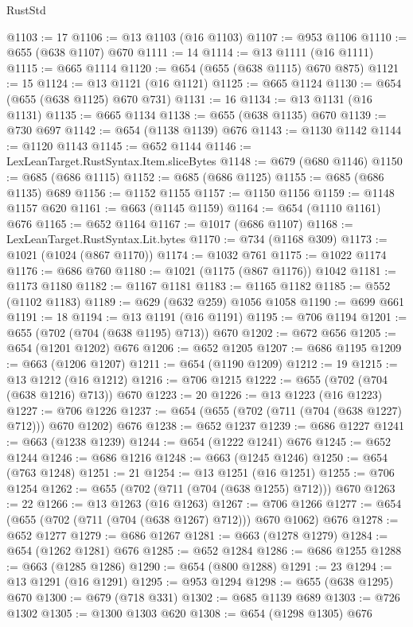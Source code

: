 \begin{lexlean}{RustStd}
\begin{coremodule}
@1103 := 17
@1106 := @13 @1103 (@16 @1103)
@1107 := @953 @1106
@1110 := @655 (@638 @1107) @670
@1111 := 14
@1114 := @13 @1111 (@16 @1111)
@1115 := @665 @1114
@1120 := @654 (@655 (@638 @1115) @670 @875)
@1121 := 15
@1124 := @13 @1121 (@16 @1121)
@1125 := @665 @1124
@1130 := @654 (@655 (@638 @1125) @670 @731)
@1131 := 16
@1134 := @13 @1131 (@16 @1131)
@1135 := @665 @1134
@1138 := @655 (@638 @1135) @670
@1139 := @730 @697
@1142 := @654 (@1138 @1139) @676
@1143 := @1130 @1142
@1144 := @1120 @1143
@1145 := @652 @1144
@1146 := LexLeanTarget.RustSyntax.Item.sliceBytes
@1148 := @679 (@680 @1146)
@1150 := @685 (@686 @1115)
@1152 := @685 (@686 @1125)
@1155 := @685 (@686 @1135) @689
@1156 := @1152 @1155
@1157 := @1150 @1156
@1159 := @1148 @1157 @620
@1161 := @663 (@1145 @1159)
@1164 := @654 (@1110 @1161) @676
@1165 := @652 @1164
@1167 := @1017 (@686 @1107)
@1168 := LexLeanTarget.RustSyntax.Lit.bytes
@1170 := @734 (@1168 @309)
@1173 := @1021 (@1024 (@867 @1170))
@1174 := @1032 @761
@1175 := @1022 @1174
@1176 := @686 @760
@1180 := @1021 (@1175 (@867 @1176)) @1042
@1181 := @1173 @1180
@1182 := @1167 @1181
@1183 := @1165 @1182
@1185 := @552 (@1102 @1183)
@1189 := @629 (@632 @259) @1056 @1058
@1190 := @699 @661
@1191 := 18
@1194 := @13 @1191 (@16 @1191)
@1195 := @706 @1194
@1201 := @655 (@702 (@704 (@638 @1195) @713)) @670
@1202 := @672 @656
@1205 := @654 (@1201 @1202) @676
@1206 := @652 @1205
@1207 := @686 @1195
@1209 := @663 (@1206 @1207)
@1211 := @654 (@1190 @1209)
@1212 := 19
@1215 := @13 @1212 (@16 @1212)
@1216 := @706 @1215
@1222 := @655 (@702 (@704 (@638 @1216) @713)) @670
@1223 := 20
@1226 := @13 @1223 (@16 @1223)
@1227 := @706 @1226
@1237 := @654 (@655 (@702 (@711 (@704 (@638 @1227) @712))) @670 @1202) @676
@1238 := @652 @1237
@1239 := @686 @1227
@1241 := @663 (@1238 @1239)
@1244 := @654 (@1222 @1241) @676
@1245 := @652 @1244
@1246 := @686 @1216
@1248 := @663 (@1245 @1246)
@1250 := @654 (@763 @1248)
@1251 := 21
@1254 := @13 @1251 (@16 @1251)
@1255 := @706 @1254
@1262 := @655 (@702 (@711 (@704 (@638 @1255) @712))) @670
@1263 := 22
@1266 := @13 @1263 (@16 @1263)
@1267 := @706 @1266
@1277 := @654 (@655 (@702 (@711 (@704 (@638 @1267) @712))) @670 @1062) @676
@1278 := @652 @1277
@1279 := @686 @1267
@1281 := @663 (@1278 @1279)
@1284 := @654 (@1262 @1281) @676
@1285 := @652 @1284
@1286 := @686 @1255
@1288 := @663 (@1285 @1286)
@1290 := @654 (@800 @1288)
@1291 := 23
@1294 := @13 @1291 (@16 @1291)
@1295 := @953 @1294
@1298 := @655 (@638 @1295) @670
@1300 := @679 (@718 @331)
@1302 := @685 @1139 @689
@1303 := @726 @1302
@1305 := @1300 @1303 @620
@1308 := @654 (@1298 @1305) @676

\end{coremodule}
\end{lexlean}
